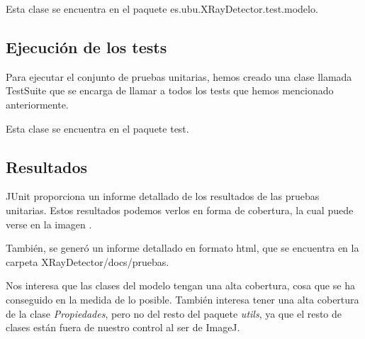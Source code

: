 Esta clase se encuentra en el paquete es.ubu.XRayDetector.test.modelo.

\subsection{Ejecución de los tests}
Para ejecutar el conjunto de pruebas unitarias, hemos creado una clase llamada TestSuite que se encarga de llamar a todos los tests que hemos mencionado anteriormente.

Esta clase se encuentra en el paquete test.

\subsection{Resultados}
JUnit proporciona un informe detallado de los resultados de las pruebas unitarias. Estos resultados podemos verlos en forma de cobertura, la cual puede verse en la imagen .


También, se generó un informe detallado en formato html, que se encuentra en la carpeta XRayDetector/docs/pruebas.

Nos interesa que las clases del modelo tengan una alta cobertura, cosa que se ha conseguido en la medida de lo posible. También interesa tener una alta cobertura de la clase \textit{Propiedades}, pero no del resto del paquete \textit{utils}, ya que el resto de clases están fuera de nuestro control al ser de ImageJ.

 
